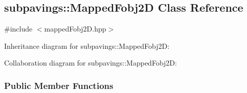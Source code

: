 \hypertarget{classsubpavings_1_1MappedFobj2D}{\subsection{subpavings\-:\-:\-Mapped\-Fobj2\-D \-Class \-Reference}
\label{classsubpavings_1_1MappedFobj2D}
}


{\ttfamily \#include $<$mapped\-Fobj2\-D.\-hpp$>$}



\-Inheritance diagram for subpavings\-:\-:\-Mapped\-Fobj2\-D\-:


\-Collaboration diagram for subpavings\-:\-:\-Mapped\-Fobj2\-D\-:
\subsubsection*{\-Public \-Member \-Functions}

